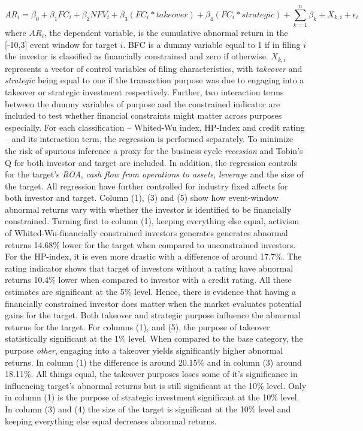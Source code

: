 \documentclass[12pt]{article}
\begin{document}
\begin{equation}
	AR_{i}=\beta_{0}+\beta_{1}FC_{i}+\beta_{2}NFV_{i}+\beta_{3}(FC_{i}*takeover)+\beta_{4}(FC_{i}*strategic)+\sum_{k=1}^{n}\beta_{k}+X_{k,i}+\epsilon_{i}
\end{equation}
where $AR_{i}$, the dependent variable, is the cumulative abnormal return in the [-10,3] event window for target $i$. BFC is a dummy variable equal to 1 if in filing $i$ the investor is classified as financially constrained and zero if otherwise. $X_{k,i}$ represents a vector of control variables of filing characteristics, with \emph{takeover} and \emph{strategic} being equal to one if the transaction purpose was due to engaging into a takeover or strategic investment respectively. Further, two interaction terms between the dummy variables of purpose and the constrained indicator are included to test whether financial constraints might matter across purposes especially. For each classification -- Whited-Wu index, HP-Index and credit rating -- and its interaction term, the regression is performed separately. To minimize the risk of spurious inference a proxy for the business cycle \emph{recession} and Tobin's Q for both investor and target are included. In addition, the regression controls for the target's \emph{ROA}, \emph{cash flow from operations to assets}, \emph{leverage} and the size of the target. All regression have further controlled for industry fixed affects for both investor and target. 
Column (1), (3) and (5) show how event-window abnormal returns vary with whether the investor is identified to be financially constrained. 
Turning first to column (1), keeping everything else equal, activism of Whited-Wu-financially constrained investors generates generates abnormal returns 14.68\% lower for the target when compared to unconstrained investors. For the HP-index, it is even more drastic with a difference of around 17.7\%. The rating indicator shows that target of investors without a rating have abnormal returns 10.4\% lower when compared to investor with a credit rating. All these estimates are significant at the 5\% level. Hence, there is evidence that having a financially constrained investor does matter when the market evaluates potential gains for the target. Both takeover and strategic purpose influence the abnormal returns for the target. For columns (1), and (5), the purpose of takeover statistically significant at the 1\% level. When compared to the base category, the purpose \emph{other}, engaging into a takeover yields significantly higher abnormal returns. In column (1) the difference is around 20.15\% and in column (3) around 18.11\%. All things equal, the takeover purposes loses some of it's significance in influencing target's abnormal returns but is still significant at the 10\% level. Only in column (1) is the purpose of strategic investment significant at the 10\% level. In column (3) and (4) the size of the target is significant at the 10\% level and keeping everything else equal decreases abnormal returns.
\end{document}
